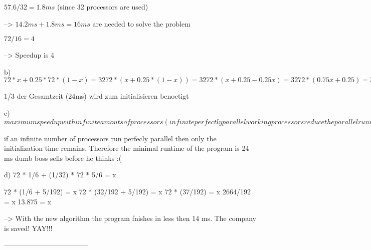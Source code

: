 \documentclass{article}
\begin{document}
$57.6 / 32 = 1.8 ms$ (since 32 processors are used)

--> $14.2 ms + 1.8 ms = 16 ms$ are needed to solve the problem

$72/16 = 4$

--> Speedup is 4


b)
$
72 * x + 0.25 * 72 * (1-x) = 32

72 * (x + 0.25 * (1-x)) = 32
72 * (x + 0.25 - 0.25x) = 32
72 * (0.75x + 0.25) = 32
48x + 16 = 32
48x = 16
x = 1/3
$

1/3 der Gesamtzeit (24ms) wird zum initialisieren benoetigt


c)
$
maximum speedup with infinite amouts of processors
(infinite perfectly parallel working processors reduce the parallel runntime to effectively zero)
= normal runtime / (initialization time + paralellized time)
= 72 / (24 + lim_{x->0} x) = 72 / (24 + 0) = 3
$


if an infinite number of processors run perfecly parallel then only the initialization time
remains. Therefore the minimal runtime of the program is 24 ms
dumb boss sells before he thinks :(

d)
72 * 1/6 + (1/32) * 72 * 5/6 = x

72 * (1/6 + 5/192) = x
72 * (32/192 + 5/192) = x
72 * (37/192) = x
2664/192 = x
13.875 = x

--> With the new algorithm the program fnishes in less then 14 ms. The company is saved! YAY!!!





------------------------------------
\end{document}
